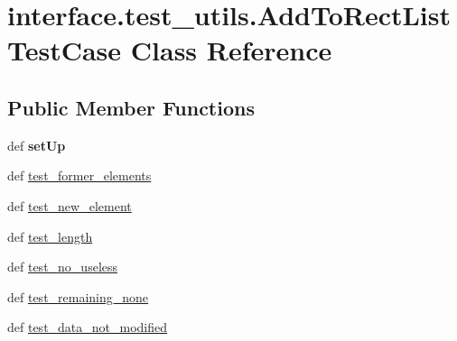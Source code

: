\hypertarget{classinterface_1_1test__utils_1_1_add_to_rect_list_test_case}{\section{interface.\-test\-\_\-utils.\-Add\-To\-Rect\-List\-Test\-Case \-Class \-Reference}
\label{classinterface_1_1test__utils_1_1_add_to_rect_list_test_case}
}
\subsection*{\-Public \-Member \-Functions}
\begin{DoxyCompactItemize}
\item 
\hypertarget{classinterface_1_1test__utils_1_1_add_to_rect_list_test_case_a164dd4becb7ad45ce4e7d1854b378b17}{def {\bfseries set\-Up}}\label{classinterface_1_1test__utils_1_1_add_to_rect_list_test_case_a164dd4becb7ad45ce4e7d1854b378b17}

\item 
def \hyperlink{classinterface_1_1test__utils_1_1_add_to_rect_list_test_case_a437dd8300fca6a65483d8cadbf3794aa}{test\-\_\-former\-\_\-elements}
\item 
def \hyperlink{classinterface_1_1test__utils_1_1_add_to_rect_list_test_case_a989346b728895354d28bed2d0eb79b42}{test\-\_\-new\-\_\-element}
\item 
def \hyperlink{classinterface_1_1test__utils_1_1_add_to_rect_list_test_case_aaac8120862e0d218b128b41c95889d37}{test\-\_\-length}
\item 
def \hyperlink{classinterface_1_1test__utils_1_1_add_to_rect_list_test_case_a4151c7fb61b72749f88b0fa8e4948be9}{test\-\_\-no\-\_\-useless}
\item 
def \hyperlink{classinterface_1_1test__utils_1_1_add_to_rect_list_test_case_ade90aab9bd5ffc116e2073b7f5acd5c5}{test\-\_\-remaining\-\_\-none}
\item 
def \hyperlink{classinterface_1_1test__utils_1_1_add_to_rect_list_test_case_ad99616dd21d1df37593129f5217f81f7}{test\-\_\-data\-\_\-not\-\_\-modified}
\end{DoxyCompactItemize}
